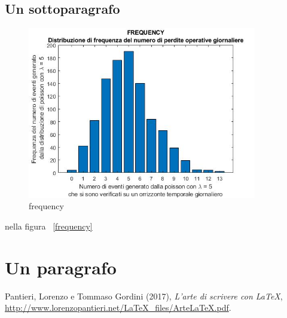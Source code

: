 \documentclass[a4paper,11pt]{article}
\begin{document}
\subsection{Un sottoparagrafo}
\lipsum[1]
\begin{figure}[htbp]
	\centering
	\includegraphics[width= 10cm]{FREQUENCY.jpg}
	\caption{frequency}
	\label{figuraaa}
\end{figure}
nella figura ~\ref{frequency}
\section{Un paragrafo}
\label{sec:esempio}
\lipsum[1]
\begin{thebibliography}{9}
Pantieri, Lorenzo e Tommaso Gordini (2017),
\emph{L’arte di scrivere con \LaTeX},
\url{http://www.lorenzopantieri.net/LaTeX_files/ArteLaTeX.pdf}.
\end{thebibliography}
\end{document}
